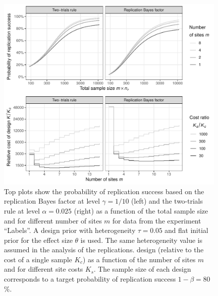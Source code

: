 \begin{figure}[!htb]
\begin{knitrout}
\color{fgcolor}
\includegraphics[width=\textwidth]{images/paper3/multisite-protzko-1}
\end{knitrout}
\caption{Top plots show the probability of replication success based on the
  replication Bayes factor at level $\gamma = 1/10$ (left) and the
  two-trials rule at level $\alpha = 0.025$ (right) as a function of
  the total sample size and for different number of sites $m$ for data from the
  experiment ``Labels''. A design prior with heterogeneity
  $\tau = 0.05$ and flat initial prior for the effect size
  $\theta$ is used. The same heterogeneity value is assumed in the analysis of the
  replications. %
  design (relative to the cost of a single sample $K_{c}$) as a function of the
  number of sites $m$ and for different site costs $K_{s}$. The sample size of
  each design corresponds to a target probability of replication success
  $1 - \beta = 80$\%.}
\label{fig:multisite}
\end{figure}

